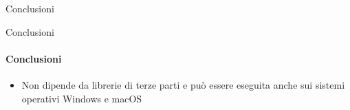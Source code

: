 \documentclass[
 ]{beamer}
\begin{document}
\begin{frame}[c]
  \centering
  \bigskip \bigskip    
  \Huge Conclusioni
\end{frame}

\begin{frame}{Conclusioni}
    \framesubtitle{Conclusioni}
    \smallskip
    \begin{itemize} [<+->]
        \setlength\itemsep{3em}
        \item \large Non dipende da librerie di terze parti e può essere eseguita anche sui sistemi operativi Windows e macOS
    \end{itemize}     
\end{frame}
\end{document}
